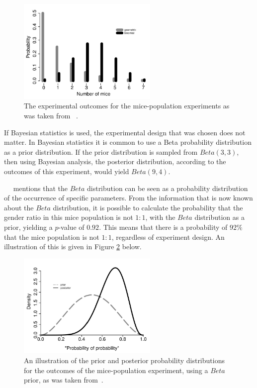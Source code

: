 \begin{figure}[htb]
      \centering
      \includegraphics[width=0.6\textwidth]{images/mouse_experiment_outcome.pdf}
      \caption{The experimental outcomes for the mice-population experiments as was taken from~\cite{ref:hackenberger:2019} .}
      \label{fig:probability:bayesian_statistics:mouse_experiment_outcome}
\end{figure}

If Bayesian statistics is used, the experimental design that was chosen does not matter. In Bayesian statistics it is common to use a Beta probability distribution as a prior distribution. If the prior distribution is sampled from $Beta(3,3)$, then using Bayesian analysis, the posterior distribution, according to the outcomes of this experiment, would yield $Beta(9,4)$.

~\citeauthor{ref:hackenberger:2019}~\cite{ref:hackenberger:2019} mentions that the $Beta$ distribution can be seen as a probability distribution of the occurrence of specific parameters. From the information that is now known about the $Beta$ distribution, it is possible to calculate the probability that the gender ratio in this mice population is not $1:1$, with the $Beta$ distribution as a prior, yielding a $p$-value of $0.92$. This means that there is a probability of $92\%$ that the mice population is not $1:1$, regardless of experiment design. An illustration of this is given in Figure \ref{fig:probability:bayesian_statistics:mouse_distributions} below.

\begin{figure}[htbp]
      \centering
      \includegraphics[width=0.6\textwidth]{images/mouse_experiment_distributions.pdf}
      \caption{An illustration of the prior and posterior probability distributions for the outcomes of the mice-population experiment, using a $Beta$ prior, as was taken from~\cite{ref:hackenberger:2019}.}
      \label{fig:probability:bayesian_statistics:mouse_distributions}
\end{figure}

